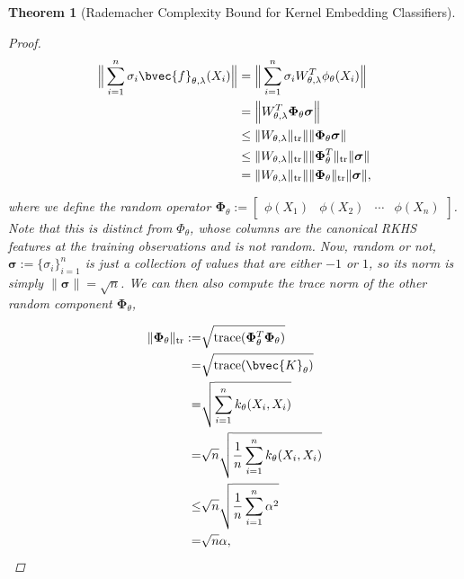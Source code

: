 \documentclass{article}
\newtheorem{theorem}{Theorem}[section]
\begin{document}
\begin{theorem}[Rademacher Complexity Bound for Kernel Embedding Classifiers]
\begin{proof}
				\begin{equation}
					\begin{aligned}
						\Big\| \sum_{i = 1}^{n} \sigma_{i}\bvec{f}_{\theta, \lambda}(X_{i}) \Big\| &= \Big\| \sum_{i = 1}^{n} \sigma_{i} W_{\theta, \lambda}^{T} \phi_{\theta}(X_{i}) \Big\| \\
						&= \Big\| W_{\theta, \lambda}^{T} \bm{\Phi}_{\theta} \bm{\sigma} \Big\| \\
						&\leq \| W_{\theta, \lambda} \|_{\mathrm{tr}} \| \| \bm{\Phi}_{\theta} \bm{\sigma} \| \\
						&\leq \| W_{\theta, \lambda} \|_{\mathrm{tr}} \| \| \bm{\Phi}_{\theta}^{T} \|_{\mathrm{tr}} \| \bm{\sigma} \| \\
						&= \| W_{\theta, \lambda} \|_{\mathrm{tr}} \| \| \bm{\Phi}_{\theta} \|_{\mathrm{tr}} \| \bm{\sigma} \|,
					\end{aligned}
				\end{equation}
				
				where we define the random operator $\bm{\Phi}_{\theta} := \begin{bmatrix} \phi(X_{1}) & \phi(X_{2}) & \cdots & \phi(X_{n}) \end{bmatrix}$. Note that this is distinct from $\Phi_{\theta}$, whose columns are the canonical RKHS features at the training observations and is not random. Now, random or not, $\bm{\sigma} := \{\sigma_{i}\}_{i = 1}^{n}$ is just a collection of values that are either $-1$ or $1$, so its norm is simply $\| \bm{\sigma} \| = \sqrt{n}$. We can then also compute the trace norm of the other random component $\bm{\Phi}_{\theta}$,
				
				\begin{equation}
					\begin{aligned}
						\| \bm{\Phi}_{\theta} \|_{\mathrm{tr}} :=& \sqrt{\mathrm{trace}(\bm{\Phi}_{\theta}^{T} \bm{\Phi}_{\theta})} \\
						=& \sqrt{\mathrm{trace}(\bvec{K}_{\theta})} \\
						=& \sqrt{\sum_{i = 1}^{n} k_{\theta}(X_{i}, X_{i})} \\
						=& \sqrt{n} \sqrt{ \frac{1}{n} \sum_{i = 1}^{n} k_{\theta}(X_{i}, X_{i})} \\
						\leq& \sqrt{n} \sqrt{ \frac{1}{n} \sum_{i = 1}^{n} \alpha^{2}} \\
						=& \sqrt{n} \alpha,
					\end{aligned}
				\end{equation}
				

\end{proof}
\end{theorem}
\end{document}
